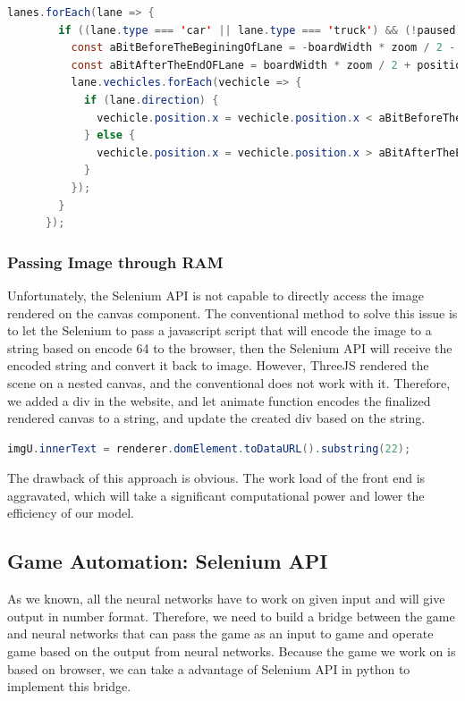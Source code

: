 \documentclass{article}
\begin{document}
\begin{lstlisting}[language = Java]
    lanes.forEach(lane => {
        if ((lane.type === 'car' || lane.type === 'truck') && (!paused)) {
          const aBitBeforeTheBeginingOfLane = -boardWidth * zoom / 2 - positionWidth * 2 * zoom;
          const aBitAfterTheEndOFLane = boardWidth * zoom / 2 + positionWidth * 2 * zoom;
          lane.vechicles.forEach(vechicle => {
            if (lane.direction) {
              vechicle.position.x = vechicle.position.x < aBitBeforeTheBeginingOfLane ? aBitAfterTheEndOFLane : vechicle.position.x -= lane.speed / 16 * delta;
            } else {
              vechicle.position.x = vechicle.position.x > aBitAfterTheEndOFLane ? aBitBeforeTheBeginingOfLane : vechicle.position.x += lane.speed / 16 * delta;
            }
          });
        }
      });
\end{lstlisting}

\subsubsection{Passing Image through RAM}
Unfortunately, the Selenium API is not capable to directly access the image rendered on the canvas component. The conventional method to solve this issue is to let the Selenium to pass a javascript script that will encode the image to a string based on encode 64 to the browser, then the Selenium API will receive the encoded string and convert it back to image. However, ThreeJS rendered the scene on a nested canvas, and the conventional does not work with it. Therefore, we added a div in the website, and let animate function encodes the finalized rendered canvas to a string, and update the created div based on the string. 

\begin{lstlisting}[language = Java]
imgU.innerText = renderer.domElement.toDataURL().substring(22);
\end{lstlisting}

The drawback of this approach is obvious. The work load of the front end is aggravated, which will take a significant computational power and lower the efficiency of our model. 

\subsection{Game Automation: Selenium API}
As we known, all the neural networks have to work on given input and will give output in number format. Therefore, we need to build a bridge between the game and neural networks that can pass the game as an input to game and operate game based on the output from neural networks. Because the game we work on is based on browser, we can take a advantage of Selenium API in python to implement this bridge. 
\end{document}
